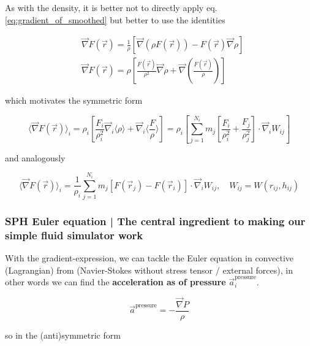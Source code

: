 As with the density, it is better not to directly apply eq. \ref{eq:gradient_of_smoothed} but better to use the identities

\begin{equation}
    \label{eq:gradient_identities}
    \begin{aligned}
    & \vec{\nabla} F(\vec{r})=\frac{1}{\rho}[\vec{\nabla} (\rho F(\vec{r}))-F(\vec{r}) \vec{\nabla} \rho] \\
    & \vec{\nabla} F(\vec{r})=\rho\left[\frac{F(\vec{r})}{\rho^2} \vec{\nabla} \rho + \vec{\nabla} \left(\frac{F(\vec{r})}{\rho}\right)\right]
    \end{aligned}
\end{equation}

which motivates the symmetric form

\begin{equation}
    \langle\vec{\nabla} F(\vec{r})\rangle_i = \rho_i \left[\frac{F_i}{\rho_i^2} \vec{\nabla}_i \langle \rho \rangle + \vec{\nabla}_i \langle \frac{F}{\rho} \rangle \right] = \rho_i\left[\sum_{j=1}^{N_i} m_j\left[\frac{F_i}{\rho_i^2}+\frac{F_j}{\rho_j^2}\right] \cdot \vec{\nabla}_i W_{i j}\right]
\end{equation}

and analogously

\begin{equation}
    \label{eq:gradient_1}
    \langle\vec{\nabla} F(\vec{r})\rangle_i=\frac{1}{\rho_i} \sum_{j=1}^{N_i} m_j\left[F\left(\vec{r}_j\right)-F\left(\vec{r}_i\right)\right] \cdot \vec{\nabla}_i W_{i j}, \quad W_{i j}=W\left(r_{i j}, h_{i j}\right)
\end{equation}

\subsubsection{SPH Euler equation | The central ingredient to making our simple fluid simulator work}

With the gradient-expression, we can tackle the Euler equation in convective (Lagrangian) from (Navier-Stokes without stress tensor / external forces),
in other words we can find the \textbf{acceleration as of pressure } $\vec{a}_i^{\text{pressure}}$.

\begin{equation}
    \vec{a}^{\text{pressure}} = -\frac{\vec{\nabla}P}{\rho}
\end{equation}

so in the (anti)symmetric form

